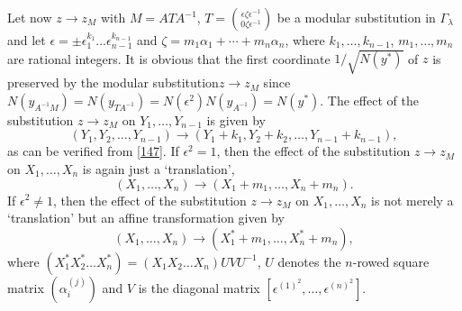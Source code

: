 Let now $z\to z_{M}$ with $M=ATA^{-1}$,
$T=\binom{\epsilon\zeta\epsilon^{-1}}{0\zeta\epsilon^{-1}}$ be a
modular substitution in $\Gamma_{\lambda}$ and let $\epsilon=\pm
\epsilon^{k_{1}}_{1}\ldots\epsilon^{k_{n-1}}_{n-1}$ and
$\zeta=m_{1}\alpha_{1}+\cdots+m_{n}\alpha_{n}$, where
$k_{1},\ldots,k_{n-1}$, $m_{1},\ldots,m_{n}$ are rational integers. It
is obvious that the first coordinate $1/\sqrt{N(y^{\ast})}$ of $z$ is
preserved by the modular substitution\pageoriginale $z\to z_{M}$ since
$N(y_{A^{-1}M})=N(y_{TA^{-1}})=N(\epsilon^{2})N(y_{A^{-1}})=N(y^{\ast})$. The
effect of the substitution $z\to z_{M}$ on $Y_{1},\ldots,Y_{n-1}$ is
given by
\begin{equation*}
(Y_{1},Y_{2},\ldots,Y_{n-1})\to
  (Y_{1}+k_{1},Y_{2}+k_{2},\ldots,Y_{n-1}+k_{n-1}),\tag{148}\label{148} 
\end{equation*}
as can be verified from \eqref{147}. If $\epsilon^{2}=1$, then the
effect of the substitution $z\to z_{M}$ on $X_{1},\ldots,X_{n}$ is
again just a `translation',
\begin{equation*}
(X_{1},\ldots,X_{n})\to (X_{1}+m_{1},\ldots,X_{n}+m_{n}).\tag{149}\label{149}
\end{equation*}
If $\epsilon^{2}\neq 1$, then the effect of the substitution $z\to
z_{M}$ on $X_{1},\ldots,X_{n}$ is not merely a `translation' but an
affine transformation given by
$$
(X_{1},\ldots,X_{n})\to
(X^{\ast}_{1}+m_{1},\ldots,X^{\ast}_{n}+m_{n}),
$$
where $(X^{\ast}_{1}X^{\ast}_{2}\ldots X^{\ast}_{n})=(X_{1}X_{2}\ldots
X_{n})UVU^{-1}$, $U$ denotes the $n$-rowed square matrix
$(\alpha^{(j)}_{i})$ and $V$ is the diagonal matrix
$[\epsilon^{(1)^{2}},\ldots,\epsilon^{(n)^{2}}]$. 

